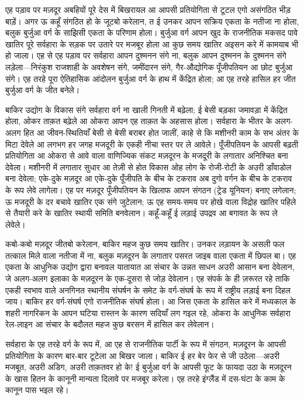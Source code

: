 \documentclass[12pt,a4paper,oneside]{book}
\begin{document}
एह पड़ाव पर मज़दूर अबहियों पूरे देस में बिखरायल आ आपसी प्रतियोगिता से टूटल एगो असंगठित भीड़ बाड़ें। अगर ऊ कहूँ संगठित हो के जूटबो करेलान, त ई उनकर आपन सक्रिय एकता के नतीजा ना होला, बलुक बुर्जुआ वर्ग के साझिसी एकता के परिणाम होला। बुर्जुआ वर्ग आपन खुद के राजनीतिक मकसद पावे खातिर पूरे सर्वहारा के सड़क पर उतारे पर मजबूर होला आ कुछ समय खातिर अइसन करे में कामयाब भी हो जाला। एह से एह पड़ाव पर सर्वहारा आपन दुश्मनन संगे ना, बलुक आपन दुश्मनन के दुश्मनन संगे लड़ेला—निरंकुश राजशाही के अवशेषन संगे, जमींदारन संगे, गैर-औद्योगिक पूँजीपतियन आ छोट बुर्जुआ संगे। एह तरहे पूरा ऐतिहासिक आंदोलन बुर्जुआ वर्ग के हाथ में केंद्रित होला; आ एह तरहे हासिल हर जीत बुर्जुआ वर्ग के जीत बनेले।

बाकिर उद्योग के विकास संगे सर्वहारा वर्ग ना खाली गिनती में बढ़ेला; ई बेसी बड़का जमावड़ा में केंद्रित होला, ओकर ताक़त बढ़ेले आ ओकरा आपन एह ताक़त के अहसास होला। सर्वहारा के भीतर के अलग-अलग हित आ जीवन-स्थितियाँ बेसी से बेसी बराबर होत जालीं, काहे से कि मशीनरी काम के सभ अंतर के मिटा देवेले आ लगभग हर जगह मजदूरी के एकही नीचा स्तर पर ले आवेले। पूँजीपतियन के आपसी बढ़ती प्रतियोगिता आ ओकरा से आवे वाला वाणिज्यिक संकट मज़दूरन के मजदूरी के लगातार अनिश्चित बना देवेला। मशीनरी में लगातार सुधार आ तेज़ी से होत विकास ओह लोग के रोजी-रोटी के अउरी डाँवाडोल बना देवेला; एके-दुके मज़दूर आ एके-दुके पूँजीपति के बीच के टकराव अब दुगो वर्गन के बीच के टकराव के रूप लेवे लागेला। एह पर मज़दूर पूँजीपतियन के खिलाफ आपन संगठन (ट्रेड यूनियन) बनाए लगेलान; ऊ मजदूरी के दर बचावे खातिर एक संगे जुटेलान; ऊ एह समय-समय पर होखे वाला विद्रोह खातिर पहिले से तैयारी करे के खातिर स्थायी समिति बनवेलान। कहूँ-कहूँ ई लड़ाई उपद्रव आ बगावत के रूप ले लेवेले।

कबो-कबो मज़दूर जीतबो करेलान, बाकिर महज कुछ समय खातिर। उनकर लड़ायन के असली फल तत्काल मिले वाला नतीजा में ना, बलुक मज़दूरन के लगातार पसरत जाइब वाला एकता में छिपल बा। एह एकता के आधुनिक उद्योग द्वारा बनावल यातायात आ संचार के उन्नत साधन अउरी आसान बना देवेलान, जे अलग-अलग इलाका के मज़दूरन के एक-दूसरा से जोड़ देवेलान। एह संपर्क के ही ज़रूरत रहे ताकि एकही स्वभाव वाले अनगिनत स्थानीय संघर्षन के समेट के वर्ग-संघर्ष के रूप में राष्ट्रीय लड़ाई बना दिहल जाय। बाकिर हर वर्ग-संघर्ष एगो राजनीतिक संघर्ष होला। आ जिस एकता के हासिल करे में मध्यकाल के शहरी नागरिकन के आपन घटिया रास्तन के कारण सदियाँ लग गइल रहे, ओकरा के आधुनिक सर्वहारा रेल-लाइन आ संचार के बदौलत महज कुछ बरसन में हासिल कर लेवेलान।

सर्वहारा के एह तरहे वर्ग के रूप में, आ एह से राजनीतिक पार्टी के रूप में संगठन, मज़दूरन के आपसी प्रतियोगिता के कारण बार-बार टूटेला आ बिखर जाला। बाकिर ई हर बेर फेर से जी उठेला—अउरी मजबूत, अउरी अडिग, अउरी ताक़तवर हो के! ई बुर्जुआ वर्ग के आपसी फूट के फायदा उठा के मज़दूरन के खास हितन के कानूनी मान्यता दिलावे पर मजबूर करेला। एह तरहे इंग्लैंड में दस-घंटा के काम के कानून पास भइल रहे।
\end{document}
